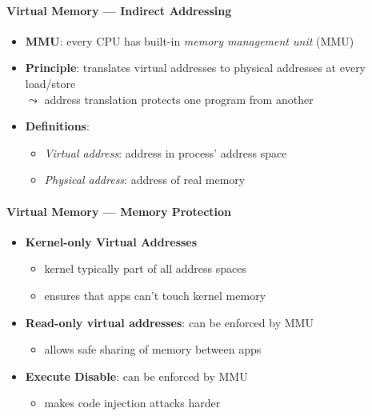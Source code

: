 \paragraph{Virtual Memory --- Indirect Addressing}
\begin{itemize}
	\item \textbf{MMU}: every CPU has built-in \emph{memory management unit} (MMU)
	\item \textbf{Principle}: translates virtual addresses to physical addresses at every load/store \\
	$ \leadsto $ address translation protects one program from another
	\item \textbf{Definitions}:
	\begin{itemize}
		\item \emph{Virtual address}: address in process' address space
		\item \emph{Physical address}: address of real memory
	\end{itemize}
\end{itemize}

\paragraph{Virtual Memory --- Memory Protection}
\begin{itemize}
	\item \textbf{Kernel-only Virtual Addresses}
	\begin{itemize}
		\item kernel typically part of all address spaces
		\item ensures that apps can't touch kernel memory
	\end{itemize}
	\item \textbf{Read-only virtual addresses}: can be enforced by MMU
	\begin{itemize}
		\item allows safe sharing of memory between apps
	\end{itemize}
	\item \textbf{Execute Disable}: can be enforced by MMU
	\begin{itemize}
		\item makes code injection attacks harder
	\end{itemize}
\end{itemize}


